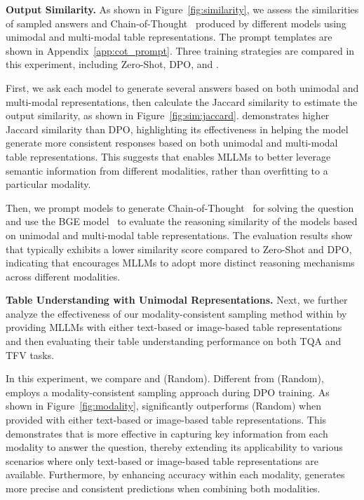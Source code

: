 \textbf{Output Similarity.} As shown in Figure~\ref{fig:similarity}, we assess the similarities of sampled answers and Chain-of-Thought~\cite{wei2022chain} produced by different models using unimodal and multi-modal table representations. The prompt templates are shown in Appendix~\ref{app:cot_prompt}. Three training strategies are compared in this experiment, including Zero-Shot, DPO, and \method{}.




First, we ask each model to generate several answers based on both unimodal and multi-modal representations, then calculate the Jaccard similarity to estimate the output similarity, as shown in Figure~\ref{fig:sim:jaccard}. \method{} demonstrates higher Jaccard similarity than DPO, highlighting its effectiveness in helping the model generate more consistent responses based on both unimodal and multi-modal table representations. This suggests that \method{} enables MLLMs to better leverage semantic information from different modalities, rather than overfitting to a particular modality.

Then, we prompt models to generate Chain-of-Thought~\cite{wei2022chain} for solving the question and use the BGE model~\cite{bge} to evaluate the reasoning similarity of the models based on unimodal and multi-modal table representations. The evaluation results show that \method{} typically exhibits a lower similarity score compared to Zero-Shot and DPO, indicating that \method{} encourages MLLMs to adopt more distinct reasoning mechanisms across different modalities.





\textbf{Table Understanding with Unimodal Representations.} Next, we further analyze the effectiveness of our modality-consistent sampling method within \method{} by providing MLLMs with either text-based or image-based table representations and then evaluating their table understanding performance on both TQA and TFV tasks. 

In this experiment, we compare \method{} and \method{} (Random). Different from \method{} (Random), \method{} employs a modality-consistent sampling approach during DPO training. As shown in Figure~\ref{fig:modality}, \method{} significantly outperforms \method{} (Random) when provided with either text-based or image-based table representations. This demonstrates that \method{} is more effective in capturing key information from each modality to answer the question, thereby extending its applicability to various scenarios where only text-based or image-based table representations are available. Furthermore, by enhancing accuracy within each modality, \method{} generates more precise and consistent predictions when combining both modalities.



